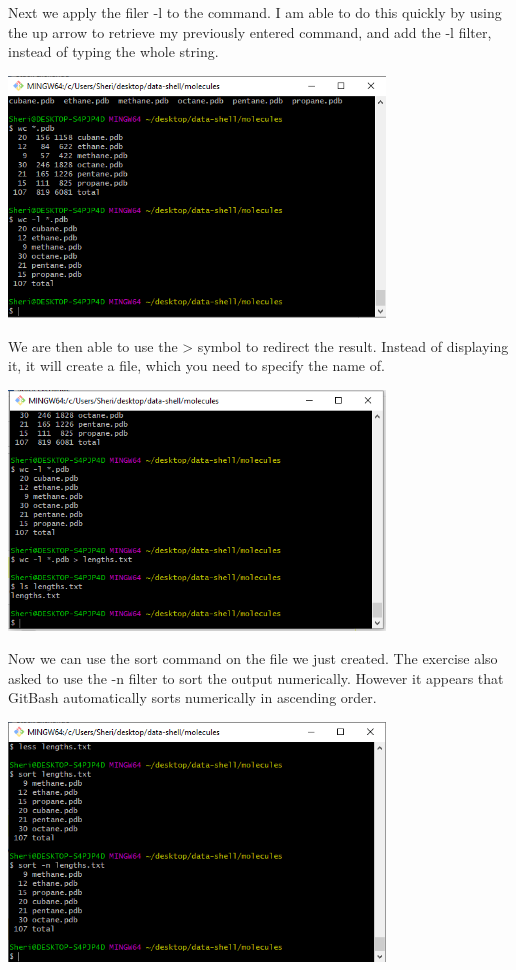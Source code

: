 \documentclass{article}
\begin{document}
Next we apply the filer -l to the command. I am able to do this quickly by using the up arrow to retrieve my previously entered command, and add the -l filter, instead of typing the whole string.

\includegraphics[width=10cm]{Images/GitBash_030.PNG}

We are then able to use the \textgreater{} symbol to redirect the result. Instead of displaying it, it will create a file, which you need to specify the name of.

\includegraphics[width=10cm]{Images/GitBash_031.PNG}

Now we can use the sort command on the file we just created. The exercise also asked to use the -n filter to sort the output numerically. However it appears that GitBash automatically sorts numerically in ascending order. 

\includegraphics[width=10cm]{Images/GitBash_032.PNG}
\end{document}
